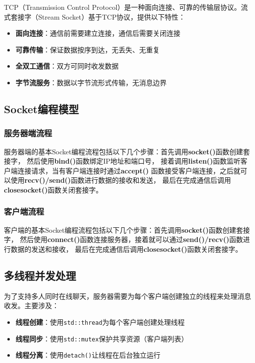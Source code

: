 \documentclass[12pt, a4paper]{article}
\newcommand{\cmd}[1]{\texttt{#1}}
\begin{document}
TCP（Transmission Control Protocol）是一种面向连接、可靠的传输层协议。流式套接字（Stream Socket）基于TCP协议，提供以下特性：

\begin{itemize}[itemsep=3pt]
  \item \textbf{面向连接}：通信前需要建立连接，通信后需要关闭连接
  \item \textbf{可靠传输}：保证数据按序到达，无丢失、无重复
  \item \textbf{全双工通信}：双方可同时收发数据
  \item \textbf{字节流服务}：数据以字节流形式传输，无消息边界
\end{itemize}

\subsection{Socket编程模型}



\subsubsection{服务器端流程}

服务器端的基本Socket编程流程包括以下几个步骤：首先调用\textbf{socket()}函数创建套接字，
然后使用\textbf{bind()}函数绑定IP地址和端口号，
接着调用\textbf{listen()}函数监听客户端连接请求，当有客户端连接时通过\textbf{accept()}
函数接受客户端连接，之后就可以使用\textbf{recv()/send()}函数进行数据的接收和发送，
最后在完成通信后调用\textbf{closesocket()}函数关闭套接字。

\subsubsection{客户端流程}

客户端的基本Socket编程流程包括以下几个步骤：首先调用\textbf{socket()}函数创建套接字，
然后使用\textbf{connect()}函数连接服务器，接着就可以通过\textbf{send()/recv()}函数进行数据的发送和接收，
最后在完成通信后调用\textbf{closesocket()}函数关闭套接字。

\subsection{多线程并发处理}

为了支持多人同时在线聊天，服务器需要为每个客户端创建独立的线程来处理消息收发。主要涉及：

\begin{itemize}[itemsep=3pt]
  \item \textbf{线程创建}：使用\cmd{std::thread}为每个客户端创建处理线程
  \item \textbf{线程同步}：使用\cmd{std::mutex}保护共享资源（客户端列表）
  \item \textbf{线程分离}：使用\cmd{detach()}让线程在后台独立运行
\end{itemize}
\end{document}
